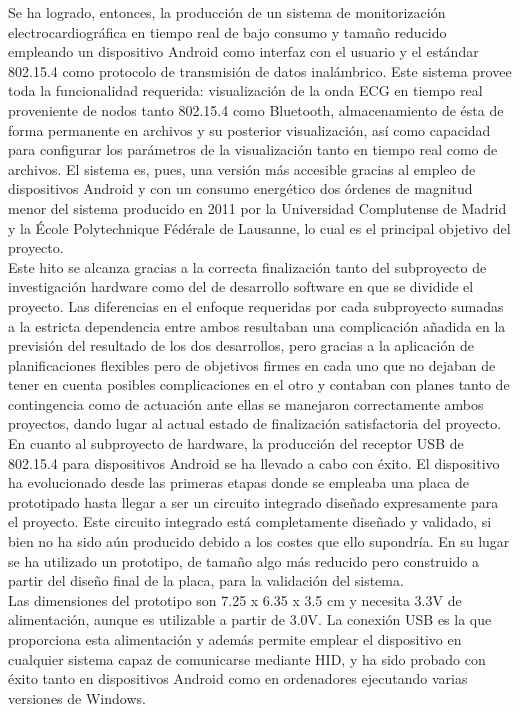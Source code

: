 	Se ha logrado, entonces, la producción de un sistema de monitorización electrocardiográfica en tiempo real de bajo consumo y tamaño reducido empleando un dispositivo Android como interfaz con el usuario y el estándar 802.15.4 como protocolo de transmisión de datos inalámbrico. Este sistema provee toda la funcionalidad requerida: visualización de la onda ECG en tiempo real proveniente de nodos tanto 802.15.4 como Bluetooth, almacenamiento de ésta de forma permanente en archivos y su posterior visualización, así como capacidad para configurar los parámetros de la visualización tanto en tiempo real como de archivos. El sistema es, pues, una versión más accesible gracias al empleo de dispositivos Android y con un consumo energético dos órdenes de magnitud menor del sistema producido en 2011 por la Universidad Complutense de Madrid y la École Polytechnique Fédérale de Lausanne, lo cual es el principal objetivo del proyecto.\\

	Este hito se alcanza gracias a la correcta finalización tanto del subproyecto de investigación hardware como del de desarrollo software en que se dividide el proyecto. Las diferencias en el enfoque requeridas por cada subproyecto sumadas a la estricta dependencia entre ambos resultaban una complicación añadida en la previsión del resultado de los dos desarrollos, pero gracias a la aplicación de planificaciones flexibles pero de objetivos firmes en cada uno que no dejaban de tener en cuenta posibles complicaciones en el otro y contaban con planes tanto de contingencia como de actuación ante ellas se manejaron correctamente ambos proyectos, dando lugar al actual estado de finalización satisfactoria del proyecto.\\

	En cuanto al subproyecto de hardware, la producción del receptor USB de 802.15.4 para dispositivos Android se ha llevado a cabo con éxito. El dispositivo ha evolucionado desde las primeras etapas donde se empleaba una placa de prototipado hasta llegar a ser un circuito integrado diseñado expresamente para el proyecto. Este circuito integrado está completamente diseñado y validado, si bien no ha sido aún producido debido a los costes que ello supondría. En su lugar se ha utilizado un prototipo, de tamaño algo más reducido pero construido a partir del diseño final de la placa, para la validación del sistema.\\

	Las dimensiones del prototipo son 7.25 x 6.35 x 3.5 cm y necesita 3.3V de alimentación, aunque es utilizable a partir de 3.0V. La conexión USB es la que proporciona esta alimentación y además permite emplear el dispositivo en cualquier sistema capaz de comunicarse mediante HID, y ha sido probado con éxito tanto en dispositivos Android como en ordenadores ejecutando varias versiones de Windows.\\

